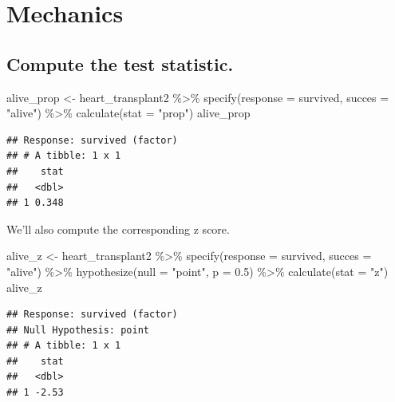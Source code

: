 \documentclass[
]{book}
\newenvironment{Shaded}{\begin{snugshade}}{\end{snugshade}}
\newcommand{\AttributeTok}[1]{\textcolor[rgb]{0.77,0.63,0.00}{#1}}
\newcommand{\FloatTok}[1]{\textcolor[rgb]{0.00,0.00,0.81}{#1}}
\newcommand{\FunctionTok}[1]{\textcolor[rgb]{0.00,0.00,0.00}{#1}}
\newcommand{\NormalTok}[1]{#1}
\newcommand{\OtherTok}[1]{\textcolor[rgb]{0.56,0.35,0.01}{#1}}
\newcommand{\SpecialCharTok}[1]{\textcolor[rgb]{0.00,0.00,0.00}{#1}}
\newcommand{\StringTok}[1]{\textcolor[rgb]{0.31,0.60,0.02}{#1}}
\begin{document}
\hypertarget{one-prop-ex-mechanics}{%
\section{Mechanics}\label{one-prop-ex-mechanics}}

\hypertarget{one-prop-ex-compute-test-stat}{%
\subsection{Compute the test statistic.}\label{one-prop-ex-compute-test-stat}}

\begin{Shaded}
\begin{Highlighting}[]
\NormalTok{alive\_prop }\OtherTok{\textless{}{-}}\NormalTok{ heart\_transplant2 }\SpecialCharTok{\%\textgreater{}\%}
    \FunctionTok{specify}\NormalTok{(}\AttributeTok{response =}\NormalTok{ survived, }\AttributeTok{succes =} \StringTok{"alive"}\NormalTok{) }\SpecialCharTok{\%\textgreater{}\%}
    \FunctionTok{calculate}\NormalTok{(}\AttributeTok{stat =} \StringTok{"prop"}\NormalTok{)}
\NormalTok{alive\_prop}
\end{Highlighting}
\end{Shaded}

\begin{verbatim}
## Response: survived (factor)
## # A tibble: 1 x 1
##    stat
##   <dbl>
## 1 0.348
\end{verbatim}

We'll also compute the corresponding z score.

\begin{Shaded}
\begin{Highlighting}[]
\NormalTok{alive\_z }\OtherTok{\textless{}{-}}\NormalTok{ heart\_transplant2 }\SpecialCharTok{\%\textgreater{}\%}
    \FunctionTok{specify}\NormalTok{(}\AttributeTok{response =}\NormalTok{ survived, }\AttributeTok{succes =} \StringTok{"alive"}\NormalTok{) }\SpecialCharTok{\%\textgreater{}\%}
    \FunctionTok{hypothesize}\NormalTok{(}\AttributeTok{null =} \StringTok{"point"}\NormalTok{, }\AttributeTok{p =} \FloatTok{0.5}\NormalTok{) }\SpecialCharTok{\%\textgreater{}\%}
    \FunctionTok{calculate}\NormalTok{(}\AttributeTok{stat =} \StringTok{"z"}\NormalTok{)}
\NormalTok{alive\_z}
\end{Highlighting}
\end{Shaded}

\begin{verbatim}
## Response: survived (factor)
## Null Hypothesis: point
## # A tibble: 1 x 1
##    stat
##   <dbl>
## 1 -2.53
\end{verbatim}
\end{document}
